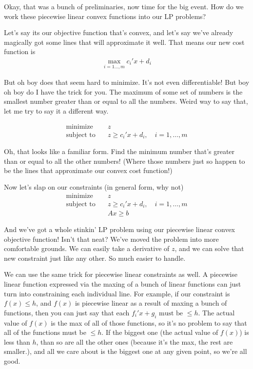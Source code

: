 \documentclass[12pt, letterpaper]{article}
\begin{document}
Okay, that was a bunch of preliminaries, now time for the big event. How do we work these piecewise linear convex functions
into our LP problems?

Let's say its our objective function that's convex, and let's say we've already magically got some lines
that will approximate it well.
That means our new cost function is 
\begin{gather*}
    \max_{i=1\dots,m} c_i'x + d_i
\end{gather*}

But oh boy does that seem hard to minimize. It's not even differentiable!
But boy oh boy do I have the trick for you.
The maximum of some set of numbers is the smallest number greater than or equal to all the numbers.
Weird way to say that, let me try to say it a different way.

\begin{align*}
    \text{minimize} \quad &z \\
    \text{subject to} \quad & z \geq c_i'x + d_i, \quad i = 1,\dots,m
\end{align*}

Oh, that looks like a familiar form.
Find the minimum number that's greater than or equal to all the other numbers!
(Where those numbers just so happen to be the lines that approximate our convex cost function!)

Now let's slap on our constraints (in general form, why not)
\begin{align*}
    \text{minimize} \quad &z \\
    \text{subject to} \quad & z \geq c_i'x + d_i, \quad i = 1,\dots,m \\
    &Ax \geq b
\end{align*}

And we've got a whole stinkin' LP problem using our piecewise linear convex objective function!
Isn't that neat?
We've moved the problem into more comfortable grounds.
We can easily take a derivative of $z$, and we can solve that new constraint just like any other.
So much easier to handle.

We can use the same trick for piecewise linear constraints as well.
A piecewise linear function expressed via the maxing of a bunch of linear functions
can just turn into constraining each individual line.
For example, if our constraint is $f(x) \leq h$, and $f(x)$ is piecewise linear as a result of maxing a bunch of functions,
then you can just say that 
each $f_i'x + g_i \text{ must be }\leq h$. The actual value of $f(x)$ is the max of all of those functions,
so it's no problem to say that all of the functions must be $\leq h$. If the biggest one (the actual value of $f(x)$)
is less than $h$, than so are all the other ones (because it's the max, the rest are smaller.),
and all we care about is the biggest one at any given point, so we're all good.
\end{document}
